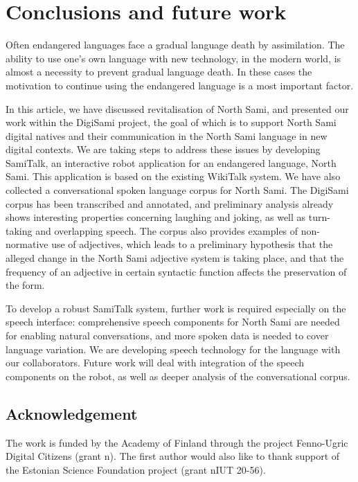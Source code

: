 \documentclass[runningheads,a4paper]{llncs}
\begin{document}

\section{Conclusions and future work}
\label{sec:conclusion}

Often endangered languages face a gradual language death by assimilation. The ability to use one's own language with new technology, in the modern world, is almost a necessity to prevent gradual language death. In these cases the motivation to continue using the endangered language is a most important factor.

In this article, we have discussed revitalisation of North Sami, and presented our work within the DigiSami project, the goal of which is to support North Sami digital natives and their communication in the North Sami language in new digital contexts.
We are taking steps to address these issues by developing SamiTalk, an interactive robot application for an endangered language, North Sami. This application is based on the existing WikiTalk system. We have also collected a conversational spoken language corpus for North Sami. The DigiSami corpus has been transcribed and annotated, and preliminary analysis already shows interesting properties concerning laughing and joking, as well as turn-taking and overlapping speech. The corpus also provides examples of non-normative use of adjectives, which leads to a preliminary hypothesis that the alleged change in the North Sami adjective system is taking place, and that the frequency of an adjective in certain syntactic function affects the preservation of the form.

To develop a robust SamiTalk system, further work is required especially on the speech interface: comprehensive speech components for North Sami are needed for enabling natural conversations, and more spoken data is needed to cover language variation. We are developing speech technology for the language with our collaborators. Future work will deal with integration of the speech components on the robot, as well as deeper analysis of the conversational corpus.


\subsection*{Acknowledgement}
The work is funded by the Academy of Finland through the project Fenno-Ugric Digital Citizens
(grant n). The first author would also like to thank support of the Estonian Science Foundation project
(grant n\textdegree IUT 20-56).
\end{document}

